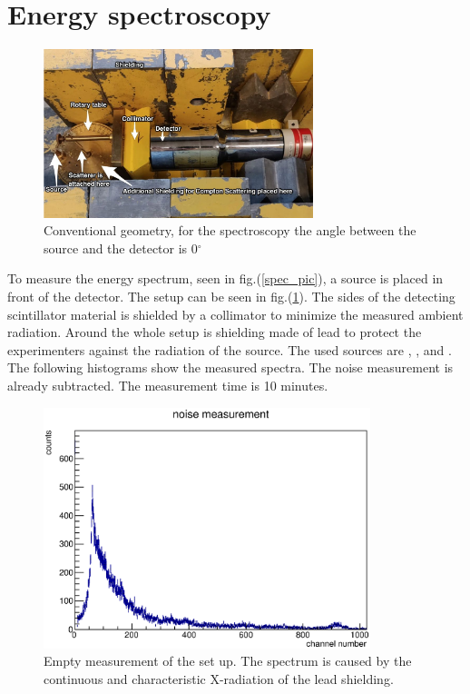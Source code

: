 \documentclass{article}
\begin{document}
\section{Energy spectroscopy}
\begin{figure}[H]
       \centering
        \includegraphics[width=0.7\textwidth]{Bilder/Conventional_Setup.png}
        \caption{Conventional geometry, for the spectroscopy the angle between the source and the detector is 0$^\circ$}
        \label{conventional}
\end{figure}
To measure the energy spectrum, seen in fig.(\ref{spec_pic}), a source is placed in front of the detector. 
The setup can be seen in fig.(\ref{conventional}).
The sides of the detecting scintillator material is shielded by a collimator to minimize the measured ambient radiation. 
Around the whole setup is shielding made of lead to protect the experimenters against the radiation of the source.
The used sources are , ,  and . The following histograms show the measured spectra. The noise measurement is already subtracted. The measurement time is 10 minutes.
\begin{figure}[H]
       \centering
        \includegraphics[width=0.85\textwidth]{Graphen/calibrate/uncalib_spectra/noise.eps}
        \caption{Empty measurement of the set up. The spectrum is caused by the continuous and characteristic X-radiation of the lead shielding.}
\end{figure}
\end{document}
